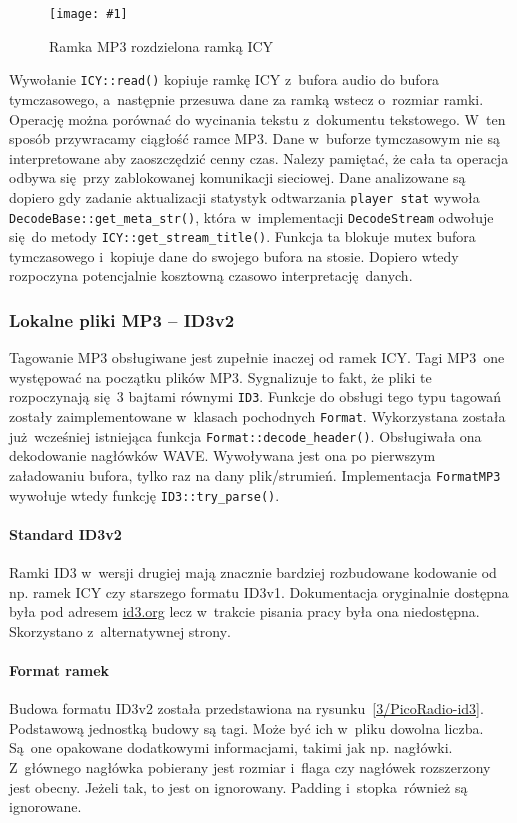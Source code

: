 \documentclass[polish]{aghengthesis}
\newcommand{\imgint}[4]{
	\begin{figure}[{#4}]
		\centering
		\texttt{[image: \#1]}
		\caption{#2}
		\label{#1}
	\end{figure}
}
\newcommand{\imgh}[3]{\imgint{#1}{#2}{#3}{H}}
\begin{document}
			\imgh{3/PicoRadio-icy}{Ramka MP3 rozdzielona ramką ICY}{0.9}
				
			Wywołanie \lstinline|ICY::read()| kopiuje ramkę ICY z~bufora audio do bufora tymczasowego, a~następnie przesuwa dane za ramką wstecz o~rozmiar ramki. Operację można porównać do wycinania tekstu z~dokumentu tekstowego. W~ten sposób przywracamy ciągłość ramce MP3. Dane w~buforze tymczasowym nie są interpretowane aby zaoszczędzić cenny czas. Nalezy pamiętać, że cała ta operacja odbywa się przy zablokowanej komunikacji sieciowej. Dane analizowane są dopiero gdy zadanie aktualizacji statystyk odtwarzania \lstinline|player stat| wywoła \lstinline|DecodeBase::get_meta_str()|, która w~implementacji \lstinline|DecodeStream| odwołuje się do metody \lstinline|ICY::get_stream_title()|. Funkcja ta blokuje mutex bufora tymczasowego i~kopiuje dane do swojego bufora na stosie. Dopiero wtedy rozpoczyna potencjalnie kosztowną czasowo interpretację danych.
		
		\subsubsection{Lokalne pliki MP3 -- ID3v2}
			Tagowanie MP3 obsługiwane jest zupełnie inaczej od ramek ICY. Tagi MP3 one występować na początku plików MP3. Sygnalizuje to fakt, że pliki te rozpoczynają się 3 bajtami równymi \lstinline|ID3|. Funkcje do obsługi tego typu tagowań zostały zaimplementowane w~klasach pochodnych \lstinline|Format|. Wykorzystana została już wcześniej istniejąca funkcja \lstinline|Format::decode_header()|. Obsługiwała ona dekodowanie nagłówków WAVE. Wywoływana jest ona po pierwszym załadowaniu bufora, tylko raz na dany plik/strumień. Implementacja \lstinline|FormatMP3| wywołuje wtedy funkcję \lstinline|ID3::try_parse()|.
			
			\paragraph{Standard ID3v2}
			Ramki ID3 w~wersji drugiej mają znacznie bardziej rozbudowane kodowanie od np. ramek ICY czy starszego formatu ID3v1. Dokumentacja oryginalnie dostępna była pod adresem \href{id3.org}{id3.org} lecz w~trakcie pisania pracy była ona niedostępna. Skorzystano z~alternatywnej strony\textsuperscript{\cite{id3_spec_mutagen}}.
			
			\paragraph{Format ramek}
			Budowa formatu ID3v2 została przedstawiona na rysunku~\ref{3/PicoRadio-id3}. Podstawową jednostką budowy są tagi. Może być ich w~pliku dowolna liczba. Są one opakowane dodatkowymi informacjami, takimi jak np. nagłówki. Z~głównego nagłówka pobierany jest rozmiar i~flaga czy nagłówek rozszerzony jest obecny. Jeżeli tak, to jest on ignorowany. Padding i~stopka również są ignorowane.
			
\end{document}

